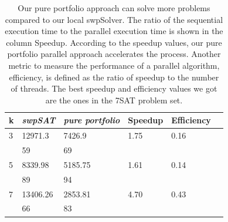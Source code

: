 \documentclass[12pt,a4paper,twoside]{scrartcl}
\numberwithin{equation}{section}
\begin{document}
   \begin{table}[H]
   \label{tab:UNIF}
\begin{center}
    \begin{tabular}{|l|l|l|l|l|p{3cm}|}
\hline 

    k &\emph{swpSAT}&\emph{pure portfolio}&Speedup&Efficiency\\ \hline      
    3 &12971.3&7426.9 & 1.75& 0.16 \\ 
    &59&69&&\\ \hline
    5&8339.98&5185.75&1.61&0.14\\ 
    &89&94&&\\ \hline
    7&13406.26&2853.81&4.70&0.43\\
    &66&83&&\\ \hline
	
\end{tabular}
\end{center}
\caption{Our pure portfolio approach can solve more problems compared to our local swpSolver.  The ratio of the sequential execution time to the parallel execution time is shown in the column Speedup. According to the speedup values, our pure portfolio parallel approach accelerates the process.  Another metric to measure the performance of a parallel algorithm, efficiency, is defined as the ratio of speedup to the number of threads. The best speedup and efficiency values we got are the ones in the 7SAT problem set. 
}
\end{table}
\end{document}
